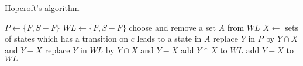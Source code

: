 \begin{algorithm}
  \caption{Hopcroft's algorithm}
  \begin{algorithmic}
      \STATE $P \leftarrow \{ F, S - F \}$
      \STATE $WL \leftarrow \{ F, S - F \}$
        \STATE choose and remove a set $A$ from $WL$
          \STATE $X \leftarrow$ sets of states which has a transition on $c$ leads to a state in $A$
            \STATE replace $Y$ in $P$ by $Y \cap X$ and $Y - X$
              \STATE replace $Y$ in $WL$ by $Y \cap X$ and $Y - X$
            \ELSE
                \STATE add $Y \cap X$ to $WL$
              \ELSE
                \STATE add $Y - X$ to $WL$
              \ENDIF
            \ENDIF
          \ENDFOR
        \ENDFOR
      \ENDWHILE
    \ENDPROCEDURE
  \end{algorithmic}
\end{algorithm}
